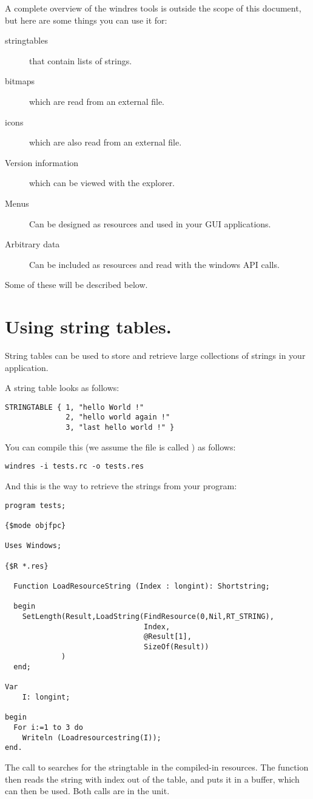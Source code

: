 A complete overview of the windres tools is outside the scope of this
document, but here are some things you can use it for:
\begin{description}
\item[stringtables] that contain lists of strings.
\item[bitmaps] which are read from an external file.
\item[icons] which are also read from an external file.
\item[Version information] which can be viewed with the \windows
explorer.
\item[Menus] Can be designed as resources and used in your GUI
applications.
\item[Arbitrary data] Can be included as resources and read with the
windows API calls.
\end{description}

Some of these will be described below.
\section{Using string tables.}
String tables can be used to store and retrieve large collections of
strings in your application.

A string table looks as follows:
\begin{verbatim}
STRINGTABLE { 1, "hello World !"
              2, "hello world again !"
              3, "last hello world !" }
\end{verbatim}
You can compile this (we assume the file is called ) as
follows:
\begin{verbatim}
windres -i tests.rc -o tests.res
\end{verbatim}
And this is the way to retrieve the strings from your program:
\begin{verbatim}
program tests;

{$mode objfpc}

Uses Windows;

{$R *.res}

  Function LoadResourceString (Index : longint): Shortstring;

  begin
    SetLength(Result,LoadString(FindResource(0,Nil,RT_STRING),
                                Index,
                                @Result[1],
                                SizeOf(Result))
             )
  end;

Var
    I: longint;

begin
  For i:=1 to 3 do
    Writeln (Loadresourcestring(I));
end.
\end{verbatim}
The call to  searches for the stringtable in the
compiled-in resources. The  function then reads the
string with index  out of the table, and puts it in a buffer,
which can then be used. Both calls are in the  unit.

